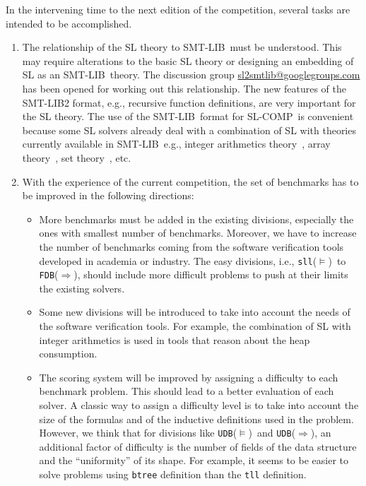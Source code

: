 \documentclass[twoside,11pt]{article}
\newcommand{\limp}{\Rightarrow}
\newcommand{\sllsat}{\texttt{sll}($\models$)}
\newcommand{\FDBent}{\texttt{FDB}($\limp$)}
\newcommand{\UDBsat}{\texttt{UDB}($\models$)}
\newcommand{\UDBent}{\texttt{UDB}($\limp$)}
\newcommand{\smtlib}{\textsf{SMT-LIB}}
\newcommand{\slcomp}{\textsf{SL-COMP}}
\begin{document}
In the intervening time to the next edition of the competition, several tasks are intended to be accomplished.
\begin{enumerate}

\item The relationship of the SL theory to \smtlib\ must be understood. 
This may require alterations to the basic SL theory or designing an embedding of SL as an \smtlib\ theory.
The discussion group \url{sl2smtlib@googlegroups.com} has been opened for working out this relationship.
The new features of the \smtlib 2 format, e.g., recursive function definitions, are very important for the SL theory.
The use of the \smtlib\ format for \slcomp\ is convenient because some SL solvers already deal with a combination of SL with theories currently available in \smtlib\, e.g., 
integer arithmetics theory~\cite{PerezR11}, array theory~\cite{BouajjaniDES12-vmcai}, set theory~\cite{PiskacWZ13}, etc.


\item With the experience of the current competition, the set of benchmarks has to be improved in the following directions:
\begin{itemize}
\item More benchmarks must be added in the existing divisions, especially the ones with smallest number of benchmarks. 
Moreover, we have to increase the number of benchmarks coming from the software verification tools developed in academia or industry.
The easy divisions, i.e., \sllsat\ to \FDBent, should include more difficult problems to push at their limits the existing solvers.

\item Some new divisions will be introduced to take into account the needs of the software verification tools. For example, the combination of SL with integer arithmetics is used in tools that reason about the heap consumption.

\item The scoring system will be improved by assigning a difficulty to each benchmark problem. This should lead to a better evaluation of each solver.
A classic way to assign a difficulty level is to take into account the size of the formulas and of the inductive definitions used in the problem. 
However, we think that for divisions like \UDBsat\ and \UDBent, an additional factor of difficulty is the number of fields of the data structure and the ``uniformity'' of its shape. 
For example, it seems to be easier to solve problems using \texttt{btree} definition than the \texttt{tll} definition.
\end{itemize}


\end{enumerate}
\end{document}
